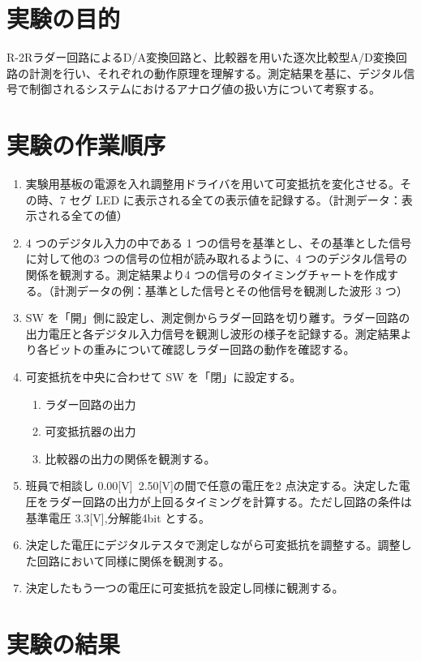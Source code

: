 \documentclass[a4paper,11pt,xelatex,ja=standard]{bxjsarticle}
\begin{document}
\section{実験の目的}
    R-2Rラダー回路によるD/A変換回路と、比較器を用いた逐次比較型A/D変換回路の計測を行い、それぞれの動作原理を理解する。測定結果を基に、デジタル信号で制御されるシステムにおけるアナログ値の扱い方について考察する。

\section{実験の作業順序}

    \begin{enumerate}
        \item 実験用基板の電源を入れ調整用ドライバを用いて可変抵抗を変化させる。その時、7 セグ LED に表示される全ての表示値を記録する。（計測データ：表示される全ての値）
        \item 4 つのデジタル入力の中である 1 つの信号を基準とし、その基準とした信号に対して他の3 つの信号の位相が読み取れるように、4 つのデジタル信号の関係を観測する。測定結果より4 つの信号のタイミングチャートを作成する。（計測データの例：基準とした信号とその他信号を観測した波形 3 つ）
        \item SW を「開」側に設定し、測定側からラダー回路を切り離す。ラダー回路の出力電圧と各デジタル入力信号を観測し波形の様子を記録する。測定結果より各ビットの重みについて確認しラダー回路の動作を確認する。
        \item 可変抵抗を中央に合わせて SW を「閉」に設定する。
            \begin{enumerate}
                \item ラダー回路の出力
                \item 可変抵抗器の出力
                \item 比較器の出力の関係を観測する。
            \end{enumerate}
        \item 班員で相談し 0.00[V]~2.50[V]の間で任意の電圧を2 点決定する。決定した電圧をラダー回路の出力が上回るタイミングを計算する。ただし回路の条件は基準電圧 3.3[V],分解能4bit とする。
        \item 決定した電圧にデジタルテスタで測定しながら可変抵抗を調整する。調整した回路において同様に関係を観測する。
        \item 決定したもう一つの電圧に可変抵抗を設定し同様に観測する。
    \end{enumerate}
\section{実験の結果}
\end{document}
